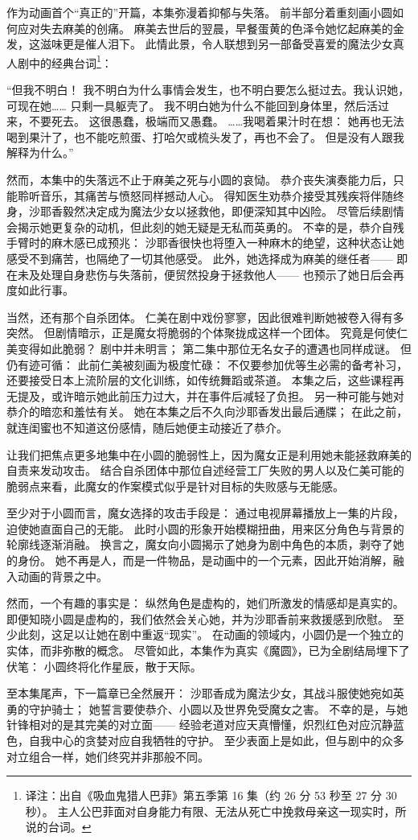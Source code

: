 作为动画首个“真正的”开篇，本集弥漫着抑郁与失落。
前半部分着重刻画小圆如何应对失去麻美的创痛。
麻美去世后的翌晨，早餐蛋黄的色泽令她忆起麻美的金发，这滋味更是催人泪下。
此情此景，令人联想到另一部备受喜爱的魔法少女真人剧中的经典台词\footnote{%
    译注：出自《吸血鬼猎人巴菲》第五季第 16 集（约 26 分 53 秒至 27 分 30 秒）。
    主人公巴菲面对自身能力有限、无法从死亡中挽救母亲这一现实时，所说的台词。
}：

“但我不明白！
我不明白为什么事情会发生，也不明白要怎么挺过去。我认识她，可现在她……
只剩一具躯壳了。
我不明白她为什么不能回到身体里，然后活过来，不要死去。
这很愚蠢，极端而又愚蠢。
……我喝着果汁时在想：
她再也无法喝到果汁了，也不能吃煎蛋、打哈欠或梳头发了，再也不会了。
但是没有人跟我解释为什么。”
\cite{buffy-body-2010}

然而，本集中的失落远不止于麻美之死与小圆的哀恸。
恭介丧失演奏能力后，只能聆听音乐，其痛苦与愤怒同样撼动人心。
得知医生劝恭介接受其残疾将伴随终身，沙耶香毅然决定成为魔法少女以拯救他，即便深知其中凶险。
尽管后续剧情会揭示她更复杂的动机，但此刻的她无疑是无私而英勇的。
不幸的是，恭介自残手臂时的麻木感已成预兆：
沙耶香很快也将堕入一种麻木的绝望，这种状态让她感受不到痛苦，也隔绝了一切其他感受。
此外，她选择成为麻美的继任者——
即在未及处理自身悲伤与失落前，便贸然投身于拯救他人——
也预示了她日后会再度如此行事。

当然，还有那个自杀团体。
仁美在剧中戏份寥寥，因此很难判断她被卷入得有多突然。
但剧情暗示，正是魔女将脆弱的个体聚拢成这样一个团体。
究竟是何使仁美变得如此脆弱？
剧中并未明言；
第二集中那位无名女子的遭遇也同样成谜。
但仍有迹可循：
此前仁美被刻画为极度忙碌：
不仅要参加优等生必需的备考补习，还要接受日本上流阶层的文化训练，如传统舞蹈或茶道。
本集之后，这些课程再无提及，或许暗示她此前压力过大，并在事件后减轻了负担。
另一种可能与她对恭介的暗恋和羞怯有关。
她在本集之后不久向沙耶香发出最后通牒；
在此之前，就连闺蜜也不知道这份感情，随后她便主动接近了恭介。

让我们把焦点更多地集中在小圆的脆弱性上，因为魔女正是利用她未能拯救麻美的自责来发动攻击。
结合自杀团体中那位自述经营工厂失败的男人以及仁美可能的脆弱点来看，此魔女的作案模式似乎是针对目标的失败感与无能感。

至少对于小圆而言，魔女选择的攻击手段是：
通过电视屏幕播放上一集的片段，迫使她直面自己的无能。
此时小圆的形象开始模糊扭曲，用来区分角色与背景的轮廓线逐渐消融。
换言之，魔女向小圆揭示了她身为剧中角色的本质，剥夺了她的身份。
她不再是人，而是一件物品，是动画中的一个元素，因此开始消解，融入动画的背景之中。

然而，一个有趣的事实是：
纵然角色是虚构的，她们所激发的情感却是真实的。
即便知晓小圆是虚构的，我们依然会关心她，并为沙耶香前来救援感到欣慰。
至少此刻，这足以让她在剧中重返“现实”。
在动画的领域内，小圆仍是一个独立的实体，而非弥散的概念。
尽管如此，本集作为真实《魔圆》，已为全剧结局埋下了伏笔：
小圆终将化作星辰，散于天际。

至本集尾声，下一篇章已全然展开：
沙耶香成为魔法少女，其战斗服使她宛如英勇的守护骑士；
她誓言要使恭介、小圆以及世界免受魔女之害。
不幸的是，与她针锋相对的是其完美的对立面——
经验老道对应天真懵懂，炽烈红色对应沉静蓝色，自我中心的贪婪对应自我牺牲的守护。
至少表面上是如此，但与剧中的众多对立组合一样，她们终究并非那般不同。
